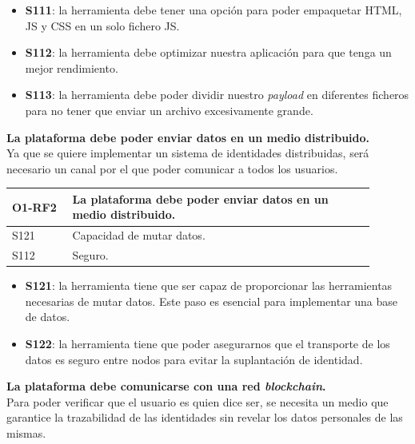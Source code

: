 \begin{itemize}
    \item \textbf{S111}: la herramienta debe tener una opción para poder empaquetar HTML, JS y CSS en un solo fichero JS.
    \item \textbf{S112}: la herramienta debe optimizar nuestra aplicación para que tenga un mejor rendimiento.
    \item \textbf{S113}: la herramienta debe poder dividir nuestro \textit{payload} en diferentes ficheros para no tener que enviar un archivo excesivamente grande.
\end{itemize}
\textbf{La plataforma debe poder enviar datos en un medio distribuido.}\\
Ya que se quiere implementar un sistema de identidades distribuidas, será necesario un canal por el que poder comunicar a todos los usuarios.
\begin{center}
    \begin{table}[h!]
        \begin{tabular}{|p{0.15\linewidth} | p{0.75\linewidth}|}
            \hline
             
            \textbf{O1-RF2} & \textbf{La plataforma debe poder enviar datos en un medio distribuido.} \\
            \hline
            S121            & Capacidad de mutar datos. \\
            \hline
            S112            & Seguro. \\
            \hline
        \end{tabular}
    \end{table}
\end{center}
\begin{itemize}
    \item \textbf{S121}: la herramienta tiene que ser capaz de proporcionar las herramientas necesarias de mutar datos. Este paso es esencial para implementar una base de datos.
    \item \textbf{S122}: la herramienta tiene que poder asegurarnos que el transporte de los datos es seguro entre nodos para evitar la suplantación de identidad.
\end{itemize}
\textbf{La plataforma debe comunicarse con una red \textit{blockchain}.}\\
Para poder verificar que el usuario es quien dice ser, se necesita un medio que garantice la trazabilidad de las identidades sin revelar los datos personales de las mismas.
